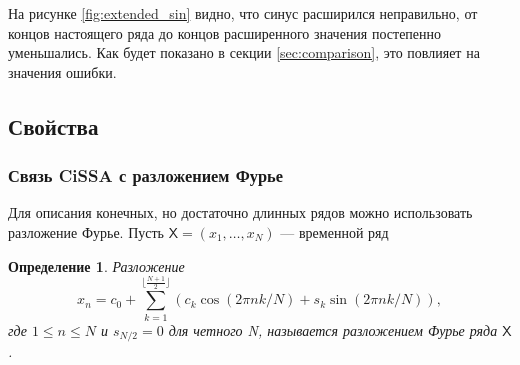 \documentclass[a4paper, 11pt]{article}
\newcommand{\SSA}{\textbf{SSA}}
\newcommand{\CISSA}{\textbf{CiSSA}}
\newcommand{\TS}{\mathsf{X}}
\newtheorem{definition}{Определение} %
\newtheorem{theorem}{Теорема} %
\begin{document}
На рисунке \ref{fig:extended_sin} видно, что синус расширился неправильно, от концов настоящего ряда до концов расширенного значения постепенно уменьшались. Как будет показано в секции \ref{sec:comparison}, это повлияет на значения ошибки.




\subsection{Свойства}

%
%
%
%
%

\subsubsection{Связь CiSSA с разложением Фурье}
\label{subsec:cissa_fourier}
Для описания конечных, но достаточно длинных рядов можно использовать разложение Фурье. Пусть $\TS = (x_1, \dots, x_N)$ — временной ряд
\begin{definition}
	Разложение
	\begin{equation}
		\label{eq:fourier}
		x_n = c_0 + \sum\limits_{k = 1}^{\lfloor \frac{N+1}{2} \rfloor}\left(c_k \cos(2\pi n k / N) + s_k \sin(2\pi n k / N) \right),
	\end{equation}
	где $1 \leq n \leq N$ и $s_{N/2} = 0 $ для четного N, называется разложением Фурье ряда $\TS$. 
\end{definition}
\end{document}
